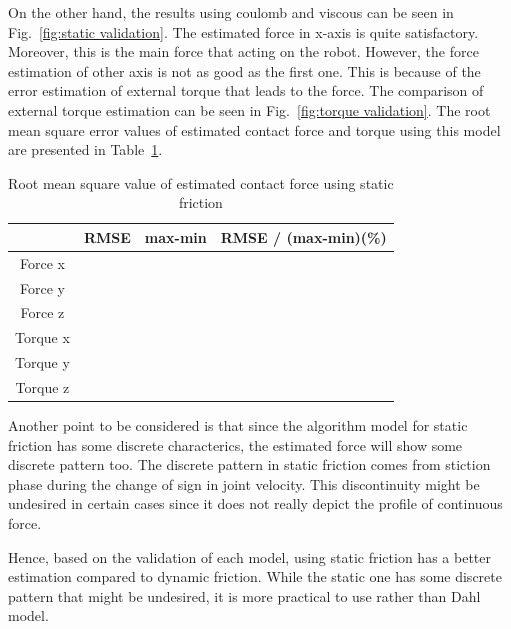 \documentclass[letterpaper, 10 pt, conference]{ieeeconf}
\newcommand{\fref}[1]{Fig.~\ref{#1}}
\newcommand{\tref}[1]{Table~\ref{#1}}
\begin{document}
On the other hand, the results using coulomb and viscous can be seen in \fref{fig:static validation}. The estimated force in x-axis is quite satisfactory. Moreover, this is the main force that acting on the robot. However, the force estimation of other axis is not as good as the first one. This is because of the error estimation of external torque that leads to the force. The comparison of external torque estimation can be seen in \fref{fig:torque validation}. The root mean square error values of estimated contact force and torque using this model are presented in \tref{table:rmse}.

\begin{table}
    \centering
    \begin{tabular}{| c | c | c | c |}
    \hline
              & RMSE & max-min & RMSE / (max-min)(\%) \\ \hline
    Force x   &   & &   \\ \hline
    Force y   &   & &   \\ \hline
    Force z   &   & &   \\ \hline
    Torque x  &   & &   \\ \hline
    Torque y  &   & &   \\ \hline
    Torque z  &   & &   \\ \hline
    \end{tabular}
    \caption{Root mean square value of estimated contact force using static friction}
    \label{table:rmse}
\end{table}

Another point to be considered is that since the algorithm model for static friction has some discrete characterics, the estimated force will show some discrete pattern too. The discrete pattern in static friction comes from stiction phase during the change of sign in joint velocity. This discontinuity might be undesired in certain cases since it does not really depict the profile of continuous force.

Hence, based on the validation of each model, using static friction has a better estimation compared to dynamic friction. While the static one has some discrete pattern that might be undesired, it is more practical to use rather than Dahl model.
\end{document}

